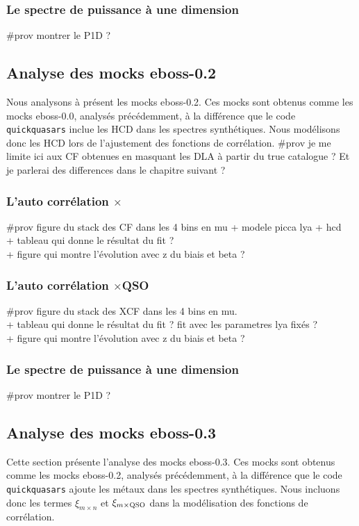 \documentclass[11pt, twoside, a4paper, openright]{report}
\begin{document}
\subsubsection{Le spectre de puissance à une dimension}
\#prov montrer le P1D ?



\subsection{Analyse des mocks eboss-0.2}
Nous analysons à présent les mocks eboss-0.2. Ces mocks sont obtenus comme les mocks eboss-0.0, analysés précédemment, à la différence que le code \texttt{quickquasars} inclue les HCD dans les spectres synthétiques. Nous modélisons donc les HCD lors de l'ajustement des fonctions de corrélation.
\#prov je me limite ici aux CF obtenues en masquant les DLA à partir du true catalogue ? Et je parlerai des differences dans le chapitre suivant ? 

\subsubsection{L'auto corrélation \lya{}$\times$\lya{}}
\#prov figure du stack des CF dans les 4 bins en mu + modele picca lya + hcd \\
+ tableau qui donne le résultat du fit ? \\
+ figure qui montre l'évolution avec z du biais et beta ?


\subsubsection{L'auto corrélation \lya{}$\times$QSO}
\#prov figure du stack des XCF dans les 4 bins en mu. \\
+ tableau qui donne le résultat du fit ? fit avec les parametres lya fixés ?\\ 
+ figure qui montre l'évolution avec z du biais et beta ? 


\subsubsection{Le spectre de puissance à une dimension}
\#prov montrer le P1D ?



\subsection{Analyse des mocks eboss-0.3}
Cette section présente l'analyse des mocks eboss-0.3. Ces mocks sont obtenus comme les mocks eboss-0.2, analysés précédemment, à la différence que le code \texttt{quickquasars} ajoute les métaux dans les spectres synthétiques. Nous incluons donc les termes $\xi_{m\times n}$ et $\xi_{m\times \textsc{QSO}}$ dans la modélisation des fonctions de corrélation.
\end{document}
